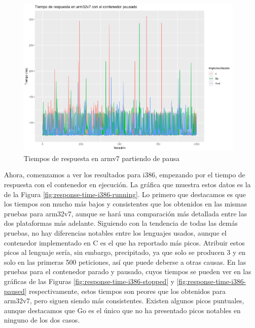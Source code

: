 \begin{figure}
    \centering
    \includegraphics[width=\textwidth]{images/response-time/arm-paused.png}
    \caption{Tiempos de respuesta en armv7 partiendo de pausa}
    \label{fig:response-time-arm-paused}
\end{figure}

\newpage

Ahora, comenzamos a ver los resultados para i386, empezando por el tiempo de
respuesta con el contenedor en ejecución. La gráfica que muestra estos datos es
la de la Figura \ref{fig:response-time-i386-running}. Lo primero que destacamos
es que los tiempos son mucho más bajos y consistentes que los obtenidos en las
mismas pruebas para arm32v7, aunque se hará una comparación más detallada entre
las dos plataformas más adelante. Siguiendo con la tendencia de todas las demás
pruebas, no hay diferencias notables entre los lenguajes usados, aunque el
contenedor implementado en C es el que ha reportado más picos. Atribuir estos
picos al lenguaje sería, sin embargo, precipitado, ya que solo se producen 3 y
en solo en las primeras 500 peticiones, así que puede deberse a otras causas. En
las pruebas para el contenedor parado y pausado, cuyos tiempos se pueden ver en
las gráficas de las Figuras \ref{fig:response-time-i386-stopped} y
\ref{fig:response-time-i386-paused} respectivamente, estos tiempos son peores
que los obtenidos para arm32v7, pero siguen siendo más consistentes. Existen
algunos picos puntuales, aunque destacamos que Go es el único que no ha
presentado picos notables en ninguno de los dos casos.


